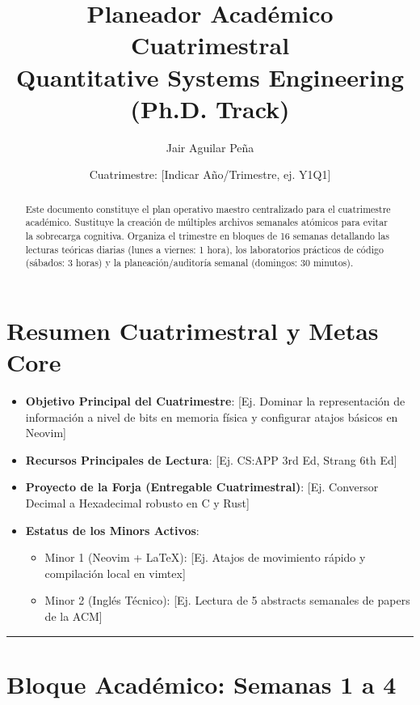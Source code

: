 \documentclass[11pt, a4paper]{article}
\title{\textbf{\color{primary}Planeador Académico Cuatrimestral\\ \large Quantitative Systems Engineering (Ph.D. Track)}}
\author{Jair Aguilar Peña}
\date{Cuatrimestre: [Indicar Año/Trimestre, ej. Y1Q1]}
\begin{document}
\maketitle

\begin{abstract}
Este documento constituye el plan operativo maestro centralizado para el cuatrimestre académico. Sustituye la creación de múltiples archivos semanales atómicos para evitar la sobrecarga cognitiva. Organiza el trimestre en bloques de 16 semanas detallando las lecturas teóricas diarias (lunes a viernes: 1 hora), los laboratorios prácticos de código (sábados: 3 horas) y la planeación/auditoría semanal (domingos: 30 minutos).
\end{abstract}

\tableofcontents
\newpage

\section{Resumen Cuatrimestral y Metas Core}
\begin{itemize}
    \item \textbf{Objetivo Principal del Cuatrimestre}: [Ej. Dominar la representación de información a nivel de bits en memoria física y configurar atajos básicos en Neovim]
    \item \textbf{Recursos Principales de Lectura}: [Ej. CS:APP 3rd Ed, Strang 6th Ed]
    \item \textbf{Proyecto de la Forja (Entregable Cuatrimestral)}: [Ej. Conversor Decimal a Hexadecimal robusto en C y Rust]
    \item \textbf{Estatus de los Minors Activos}:
    \begin{itemize}
        \item Minor 1 (Neovim + \LaTeX): [Ej. Atajos de movimiento rápido y compilación local en vimtex]
        \item Minor 2 (Inglés Técnico): [Ej. Lectura de 5 abstracts semanales de papers de la ACM]
    \end{itemize}
\end{itemize}

\noindent\rule{\textwidth}{0.4pt}
\newpage

\section{Bloque Académico: Semanas 1 a 4}
\end{document}

